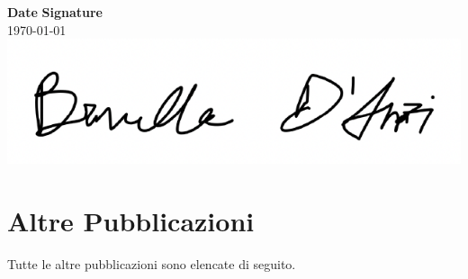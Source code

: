\documentclass[11pt]{res}
\newif\ifext
\newenvironment{extended}{\ifext}{\fi}
\newcommand{\MarginText}[1]{\section{#1}\vspace{10pt}}
\begin{document}
\begin{resume}
\vspace{25mm}
\center \textbf{Date} \hfill \textbf{Signature}\\
\today \hfill\includegraphics[scale=0.6]{signature.png}\\


\clearpage

\begin{extended}
\nocite{*}
\MarginText{Altre Pubblicazioni}

Tutte le altre pubblicazioni sono elencate di seguito.

\vspace{10pt}
\printbibliography[heading=none,sorting=ynt]
\end{extended}

\end{resume}
\end{document}
